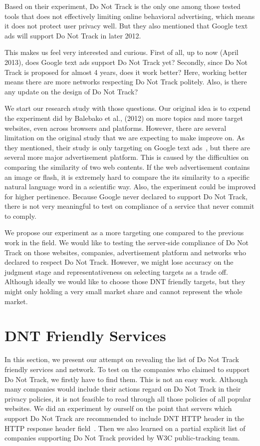 \documentclass{sig-alternate}
\begin{document}
Based on their experiment, Do Not Track is the only one among those tested tools that does not effectively limiting online behavioral advertising, which means it does not protect user privacy well. But they also mentioned that Google text ads will support Do Not Track in later 2012.

This makes us feel very interested and curious. First of all, up to now (April 2013), does Google text ads support Do Not Track yet? Secondly, since Do Not Track is proposed for almost 4 years, does it work better? Here, working better means there are more networks respecting Do Not Track politely. Also, is there any update on the design of Do Not Track?

We start our research study with those questions. Our original idea is to expend the experiment did by Balebako et al., (2012) on more topics and more target websites, even across browsers and platforms. However, there are several limitation on the original study that we are expecting to make improve on. As they mentioned, their study is only targeting on Google text ads~\cite{balebako2012measuring}, but there are several more major advertisement platform. This is caused by the difficulties on comparing the similarity of two web contents. If the web advertisement contains an image or flash, it is extremely hard to compare the its similarity to a specific natural language word in a scientific way. Also, the experiment could be improved for higher pertinence. Because Google never declared to support Do Not Track, there is not very meaningful to test on compliance of a service that never commit to comply. 

We propose our experiment as a more targeting one compared to the previous work in the field. We would like to testing the server-side compliance of Do Not Track on those websites, companies, advertisement platform and networks who declared to respect Do Not Track. However, we might lose accuracy on the judgment stage and representativeness on selecting targets as a trade off. Although ideally we would like to choose those DNT friendly targets, but they might only holding a very small market share and cannot represent the whole market.

\section{DNT Friendly Services} \label{sec:services}

In this section, we present our attempt on revealing the list of Do Not Track friendly services and network. To test on the companies who claimed to support Do Not Track, we firstly have to find them. This is not an easy work. Although many companies would include their actions regard on Do Not Track in their privacy policies, it is not feasible to read through all those policies of all popular websites. We did an experiment by ourself on the point that servers which support Do Not Track are recommended to include DNT HTTP header in the HTTP response header field~\cite{dntdraft}. Then we also learned on a partial explicit list of companies supporting Do Not Track provided by W3C public-tracking team.
\end{document}
